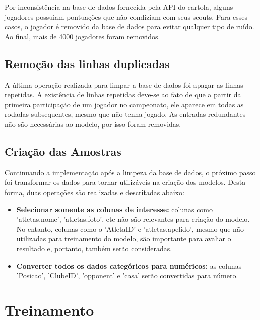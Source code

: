 \documentclass[conference]{IEEEtran}
\begin{document}
Por inconsistência  na base de  dados fornecida pela API  do cartola,
alguns  jogadores possuiam  pontuações que  não condiziam  com seus
scouts. Para esses casos, o jogador  é removido da base de dados para
evitar qualquer tipo de ruído. Ao final, mais de 4000 jogadores foram
removidos.

\subsection{Remoção das linhas duplicadas}

A última operação realizada para limpar  a base de dados foi apagar
as  linhas repetidas.  A existência  de linhas  repetidas deve-se  ao
fato  de que  a partir  da primeira  participação de  um jogador  no
campeonato, ele  aparece em todas  as rodadas subsequentes,  mesmo que
não tenha jogado.  As entradas redundantes não  são necessárias ao
modelo, por isso foram removidas.

\subsection{Criação das Amostras}

Continuando  a implementação  após a  limpeza da  base de  dados, o
próximo passo  foi transformar os  dados para tornar  utilizáveis na
criação dos modelos. Desta forma, duas operações são realizadas e
descritadas abaixo:

\begin{itemize}

\item  \textbf{Selecionar somente  as colunas  de interesse:}  colunas
como  'atletas.nome', 'atletas.foto',  etc não  são relevantes  para
criação  do  modelo.  No  entanto,   colunas  como  o  'AtletaID'  e
'atletas.apelido',  mesmo  que  não utilizadas  para  treinamento  do
modelo, são importante para avaliar  o resultado e, portanto, também
serão consideradas.

\item \textbf{Converter todos os  dados categóricos para numéricos:}
as   colunas  'Posicao',   'ClubeID',  'opponent'   e  'casa'   serão
convertidas para número.

\end{itemize}

\section{Treinamento}
\end{document}
